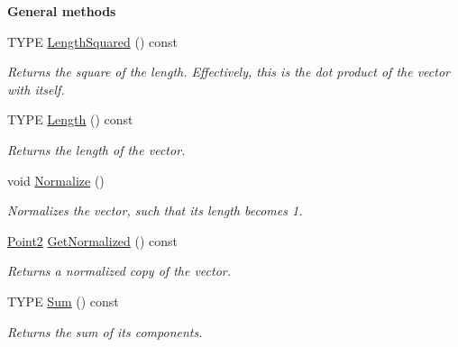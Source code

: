 \begin{Indent}\textbf{ General methods}\par
\begin{DoxyCompactItemize}
\item 
\mbox{\label{classcy_1_1_point2_a11b64067ef81e8cbe8c82dbfe3ce22cf}} 
T\+Y\+PE \mbox{\hyperlink{classcy_1_1_point2_a11b64067ef81e8cbe8c82dbfe3ce22cf}{Length\+Squared}} () const
\begin{DoxyCompactList}\small\item\em Returns the square of the length. Effectively, this is the dot product of the vector with itself. \end{DoxyCompactList}\item 
\mbox{\label{classcy_1_1_point2_af56376b3def42a3f15ac49b4ca6fb684}} 
T\+Y\+PE \mbox{\hyperlink{classcy_1_1_point2_af56376b3def42a3f15ac49b4ca6fb684}{Length}} () const
\begin{DoxyCompactList}\small\item\em Returns the length of the vector. \end{DoxyCompactList}\item 
\mbox{\label{classcy_1_1_point2_a8cc755aa177e092f109e59d59bb5b93e}} 
void \mbox{\hyperlink{classcy_1_1_point2_a8cc755aa177e092f109e59d59bb5b93e}{Normalize}} ()
\begin{DoxyCompactList}\small\item\em Normalizes the vector, such that its length becomes 1. \end{DoxyCompactList}\item 
\mbox{\label{classcy_1_1_point2_ac2859fd8c141324e4cb92440eb73b5f8}} 
\mbox{\hyperlink{classcy_1_1_point2}{Point2}} \mbox{\hyperlink{classcy_1_1_point2_ac2859fd8c141324e4cb92440eb73b5f8}{Get\+Normalized}} () const
\begin{DoxyCompactList}\small\item\em Returns a normalized copy of the vector. \end{DoxyCompactList}\item 
\mbox{\label{classcy_1_1_point2_ad4d0963990f9d05c69d5d69324513e3a}} 
T\+Y\+PE \mbox{\hyperlink{classcy_1_1_point2_ad4d0963990f9d05c69d5d69324513e3a}{Sum}} () const
\begin{DoxyCompactList}\small\item\em Returns the sum of its components. \end{DoxyCompactList}\item 

\end{DoxyCompactItemize}
\end{Indent}
